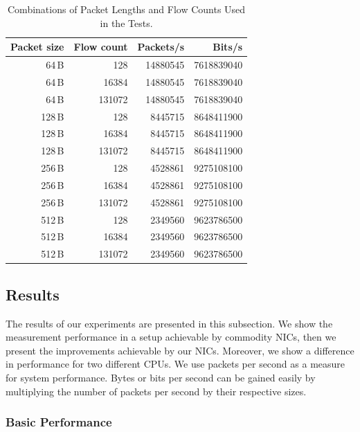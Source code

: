 \renewcommand{\arraystretch}{1.1}
\begin{table}[!t]
        \centering
        \begin{tabular}{rrrr}
        \toprule
        \textbf{Packet size} & \textbf{Flow count} & \textbf{Packets/s} & \textbf{Bits/s}\\ \midrule
        64\,B & 128 & 14880545 & 7618839040 \\
        64\,B & 16384 & 14880545 & 7618839040 \\
        64\,B & 131072 & 14880545 & 7618839040 \\ \midrule
        128\,B & 128 & 8445715 & 8648411900 \\
        128\,B & 16384 & 8445715 & 8648411900 \\
        128\,B & 131072 & 8445715 & 8648411900 \\ \midrule
        256\,B & 128 & 4528861 & 9275108100 \\
        256\,B & 16384 & 4528861 & 9275108100 \\
        256\,B & 131072 & 4528861 & 9275108100 \\ \midrule
        512\,B & 128 & 2349560 & 9623786500 \\
        512\,B & 16384 & 2349560 & 9623786500 \\
        512\,B & 131072 & 2349560 & 9623786500 \\
        \bottomrule
        \end{tabular}
        \caption{Combinations of Packet Lengths and Flow Counts Used in the Tests.}
        \label{tab:test-data}
\end{table}


\subsection{Results} \label{subsec:high-density-results}

The results of our experiments are presented in this subsection. We show the measurement performance in a setup achievable by commodity NICs, then we present the improvements achievable by our NICs. Moreover, we show a difference in performance for two different CPUs. We use packets per second as a measure for system performance. Bytes or bits per second can be gained easily by multiplying the number of packets per second by their respective sizes.

\subsubsection{Basic Performance}

